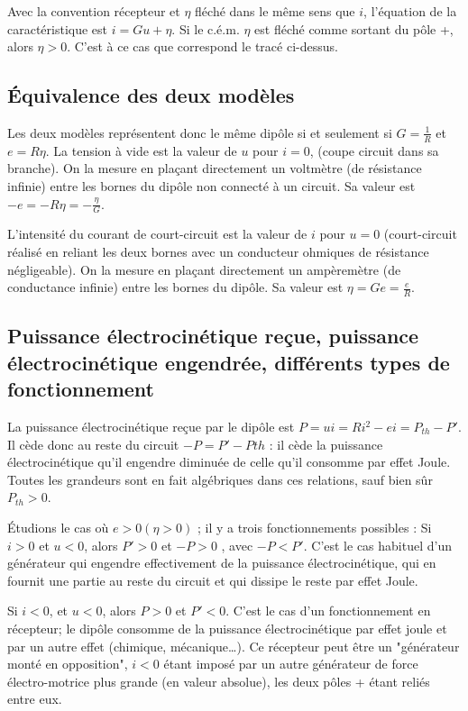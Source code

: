 Avec la convention récepteur et \(\eta\) fléché dans le même sens que \(i\), 
l'équation de la caractéristique est \(i=Gu+\eta\). Si le c.é.m. \(\eta\) est 
fléché comme sortant du pôle +, alors \(\eta > 0\). C'est à ce cas que 
correspond le tracé ci-dessus.

\subsection{Équivalence des deux modèles}%

Les deux modèles représentent donc le même dipôle si et seulement si 
\(G=\frac{1}{R}\) et \(e = R \eta\). La tension à vide est la valeur de \(u\) 
pour \(i = 0\), (coupe circuit dans sa branche). On la mesure en plaçant 
directement un voltmètre (de résistance infinie) entre les bornes du dipôle non 
connecté à un circuit. Sa valeur est \(-e = -R\eta = -\frac{\eta}{G}\).

L'intensité du courant de court-circuit est la valeur de \(i\) pour \(u = 0\) 
(court-circuit réalisé en reliant les deux bornes avec un conducteur ohmiques 
de résistance négligeable). On la mesure en plaçant directement un ampèremètre 
(de conductance infinie) entre les bornes du dipôle. Sa valeur est \(\eta = Ge 
= \frac{e}{R}\).

\subsection{Puissance électrocinétique reçue, puissance électrocinétique
engendrée, différents types de fonctionnement}

La puissance électrocinétique reçue par le dipôle est \(P  = u i = R i^2 - e i 
= P_{th} - P'\). Il cède donc au reste du circuit \(-P  = P' -P{th}\) : il cède 
la puissance électrocinétique qu'il engendre diminuée de celle qu'il consomme 
par effet Joule. Toutes les grandeurs sont en fait algébriques dans ces 
relations, sauf  bien sûr \(P_{th} > 0\).

Étudions le cas où \(e > 0 (\eta > 0)\) ; il y a trois fonctionnements 
possibles :
Si \(i > 0\)  et \(u < 0\), alors \(P'> 0\) et \(-P  > 0\) , avec \(-P  < P'\). 
C'est le cas habituel d'un générateur qui engendre effectivement de la 
puissance électrocinétique, qui en fournit une partie au reste du circuit et 
qui dissipe le reste par effet Joule.

Si \(i < 0\), et \(u < 0\), alors \(P > 0\) et \(P' < 0\). C'est le cas d'un 
fonctionnement en récepteur; le dipôle consomme de la puissance 
électrocinétique par effet joule et par un autre effet (chimique, 
mécanique\ldots). Ce récepteur peut être un "générateur monté en opposition", \(i 
< 0\) étant imposé par un autre générateur de force électro-motrice plus grande 
(en valeur absolue), les deux pôles + étant reliés entre eux.

